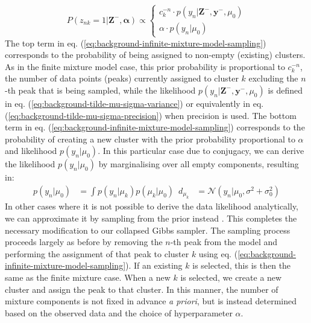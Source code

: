 \begin{equation}
P(z_{nk}=1 \vert \boldsymbol{Z}^{-}, \boldsymbol{\alpha}) \propto 
\begin{cases}
    c^{-n}_k \cdot p(y_n \vert \boldsymbol{Z}^{-},  \boldsymbol{y}^{-}, \mu_0) \\
    \alpha \cdot p(y_n \vert \mu_0)
\end{cases}
\label{eq:background-infinite-mixture-model-sampling}
\end{equation}
The top term in eq. (\ref{eq:background-infinite-mixture-model-sampling}) corresponds to the probability of being assigned to non-empty (existing) clusters. As in the finite mixture model case, this prior probability is proportional to $c^{-n}_k$, the number of data points (peaks) currently assigned to cluster $k$ excluding the $n$-th peak that is being sampled, while the likelihood $p(y_n \vert \boldsymbol{Z}^{-},  \boldsymbol{y}^{-}, \mu_0)$ is defined in eq. (\ref{eq:background-tilde-mu-sigma-variance}) or equivalently in eq. (\ref{eq:background-tilde-mu-sigma-precision}) when precision is used. The bottom term in eq. (\ref{eq:background-infinite-mixture-model-sampling}) corresponds to the probability of creating a new cluster with the prior probability proportional to $\alpha$ and likelihood $p(y_n \vert \mu_0)$. In this particular case due to conjugacy, we can derive the likelihood $p(y_n \vert \mu_0)$ by marginalising over all empty components, resulting in:
\begin{equation}
\begin{aligned}
p(y_n \vert \mu_0) &= \int p(y_n \vert \mu_k) p(\mu_k \vert \mu_0) \enspace d_{\mu_k}
                               &= \mathcal{N}(y_n \vert \mu_0, \sigma^2 + \sigma_0^2)
\end{aligned}
\label{eq:background-new-table-likelihood}
\end{equation}
In other cases where it is not possible to derive the data likelihood analytically, we can approximate it by sampling from the prior instead \cite{Rasmussen2000}. This completes the necessary modification to our collapsed Gibbs sampler. The sampling process proceeds largely as before by removing the $n$-th peak from the model and performing the assignment of that peak to cluster $k$ using eq. (\ref{eq:background-infinite-mixture-model-sampling}). If an existing $k$ is selected, this is then the same as the finite mixture case. When a new $k$ is selected, we create a new cluster and assign the peak to that cluster. In this manner, the number of mixture components is not fixed in advance \textit{a priori}, but is instead determined based on the observed data and the choice of hyperparameter $\alpha$.

